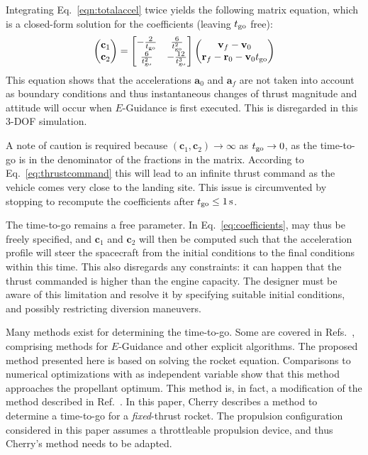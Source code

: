 \documentclass[%
]{aiaa-tc}
\begin{document}
Integrating Eq.~\eqref{eqn:totalaccel} twice yields the following matrix equation, which
is a closed-form solution for the coefficients (leaving $t_{\text{go}}$ free):
\begin{align}
    \begin{pmatrix}
	\mathbf{c}_1\\ \mathbf{c}_2
    \end{pmatrix} =
    \begin{bmatrix}
	-\frac{2}{t_{\text{go}}}   &  \frac{6}{t_{\text{go}}^2}\\
	 \frac{6}{t_{\text{go}}^2} & -\frac{12}{t_{\text{go}}^3}\\
    \end{bmatrix}
    \begin{pmatrix}
	\mathbf{v}_f - \mathbf{v}_0\\
	\mathbf{r}_f - \mathbf{r}_0 - \mathbf{v}_0 t_{\text{go}}
    \end{pmatrix}
    \label{eq:coefficients}
\end{align}
This equation shows that the accelerations $\mathbf{a}_0$ and $\mathbf{a}_f$
are not taken into account as boundary conditions and thus instantaneous changes
of thrust magnitude and attitude will occur when $E$-Guidance is first executed.
This is disregarded in this 3-DOF simulation.

A note of caution is required because $(\mathbf{c}_1, \mathbf{c}_2) \to \infty$
as $t_{\text{go}}\to0$, as the time-to-go is in the denominator of the fractions in the
matrix. According to Eq.~\eqref{eq:thrustcommand} this will lead to an
infinite thrust command as the vehicle comes very close to the landing site.
This issue is circumvented by stopping to recompute the coefficients after
$t_{\text{go}}\leq \SI{1}{\second}$.

The time-to-go remains a free parameter. In Eq.~\eqref{eq:coefficients},
\tgo may thus be freely specified, and $\mathbf{c}_1$ and $\mathbf{c}_2$
will then be computed such that the acceleration profile will steer the
spacecraft from the initial conditions to the final conditions within this time.
This also disregards any constraints: it can happen that the thrust commanded is
higher than the engine capacity. The designer must be aware of this limitation
and resolve it by specifying suitable initial conditions, and possibly
restricting diversion maneuvers. 

Many methods exist for determining the time-to-go. Some are covered in
Refs.~,
comprising methods for $E$-Guidance and other explicit algorithms. The proposed
method presented here is based on solving the rocket equation. Comparisons to
numerical optimizations with \tgo as independent variable show that this method
approaches the propellant optimum.  This method is, in fact, a modification of
the method described in Ref.~. In this paper, Cherry
describes a method to determine a time-to-go for a \emph{fixed}-thrust rocket.
The propulsion configuration considered in this paper assumes a throttleable
propulsion device, and thus Cherry's method needs to be adapted.
\end{document}
